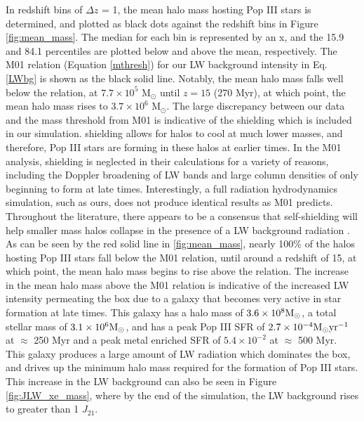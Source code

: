 \documentclass[a4paper,fleqn,usenatbib]{mnras}
\begin{document}
In redshift bins of $\Delta z$ = 1, the mean halo mass hosting Pop III stars is determined, and plotted as black dots against the redshift bins in Figure \ref{fig:mean_mass}. The median for each bin is represented by an x, and the 15.9 and 84.1 percentiles are plotted below and above the mean, respectively. The M01 relation (Equation \ref{mthresh}) for our LW background intensity in Eq. \ref{LWbg} is shown as the black solid line. Notably, the mean halo mass falls well below the relation, at $7.7 \times 10^{5}$ M$_{\odot}$ until $z = 15$ (270 Myr), at which point, the mean halo mass rises to $3.7 \times 10^{6}$ M$_{\odot}$. The large discrepancy between our data and the mass threshold from M01 is indicative of the \hh{} shielding which is included in our simulation. \hh{} shielding allows for halos to cool at much lower masses, and therefore, Pop III stars are forming in these halos at earlier times. In the M01 analysis, \hh{} shielding is neglected in their calculations for a variety of reasons, including the Doppler broadening of LW bands and large column densities of \hh{} only beginning to form at late times. Interestingly, a full radiation hydrodynamics simulation, such as ours, does not produce identical results as M01 predicts. Throughout the literature, there appears to be a consensus that \hh{} self-shielding will help smaller mass halos collapse in the presence of a LW background radiation \citep[E.g.][]{Yoshida03, Ricotti01, Glover01, Hartwig15}. As can be seen by the red solid line in \ref{fig:mean_mass}, nearly 100\% of the halos hosting Pop III stars fall below the M01 relation, until around a redshift of 15, at which point, the mean halo mass begins to rise above the relation. The increase in the mean halo mass above the M01 relation is indicative of the increased LW intensity permeating the box due to a galaxy that becomes very active in star formation at late times. This galaxy has a halo mass of $3.6 \times 10^{8} \rm M_{\odot}$, a total stellar mass of $3.1 \times 10^{6} \rm M_{\odot}$, and has a peak Pop III SFR of $2.7 \times 10^{-4} \rm M_{\odot} yr^{-1}$ at $\approx$ 250 Myr and a peak metal enriched SFR of $5.4 \times 10^{-2}$ at $\approx$ 500 Myr. This galaxy produces a large amount of LW radiation which dominates the box, and drives up the minimum halo mass required for the formation of Pop III stars. This increase in the LW background can also be seen in Figure \ref{fig:JLW_xe_mass}, where by the end of the simulation, the LW background rises to greater than 1 $J_{21}$.
\end{document}

